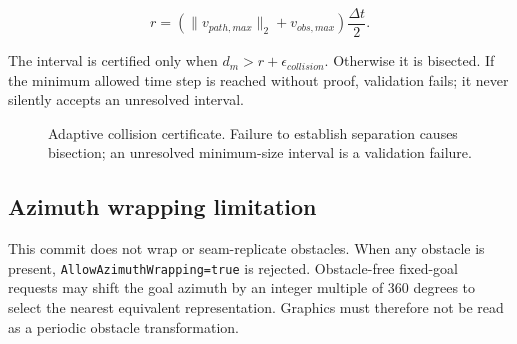 \documentclass[10pt,letterpaper]{article}
\newcommand{\file}[1]{\nolinkurl{#1}}
\begin{document}
\begin{equation}\label{eq:collisioncertificate}
r=\left(\lVert v_{path,max}\rVert_2+v_{obs,max}\right)
\frac{\Delta t}{2}.
\end{equation}

The interval is certified only when
$d_m>r+\epsilon_{collision}$. Otherwise it is bisected. If the minimum allowed
time step is reached without proof, validation fails; it never silently
accepts an unresolved interval.

\begin{figure}[ht]
\centering
{}
\caption{Adaptive collision certificate. Failure to establish separation
causes bisection; an unresolved minimum-size interval is a validation failure.}
\label{fig:adaptivevalidation}
\end{figure}

\subsection{Azimuth wrapping limitation}

This commit does not wrap or seam-replicate obstacles. When any obstacle is
present, \file{AllowAzimuthWrapping=true} is rejected. Obstacle-free fixed-goal
requests may shift the goal azimuth by an integer multiple of 360 degrees to
select the nearest equivalent representation. Graphics must therefore not be
read as a periodic obstacle transformation.
\end{document}

